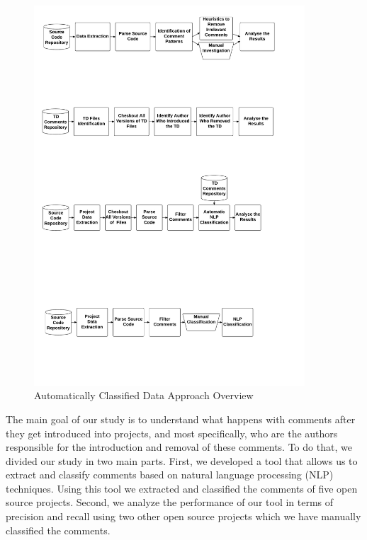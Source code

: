 
\begin{figure}[thb!]
  \centering
  \includegraphics[width=0.90\textwidth]{figures/automatically_classified_data_approach2.pdf}
  \caption{Automatically Classified Data Approach Overview}
  \label{fig:automatically_classified_data_approach_overview}
\end{figure}

The main goal of our study is to understand what happens with \SATD comments after they get introduced into projects, and most specifically, who are the authors responsible for the introduction and removal of these comments. To do that, we divided our study in two main parts. First, we developed a tool that allows us to extract and classify \SATD comments based on natural language processing (NLP) techniques. Using this tool we extracted and classified the comments of five open source projects. Second, we analyze the performance of our tool in terms of precision and recall using two other open source projects which we have manually classified the \SATD comments. 

